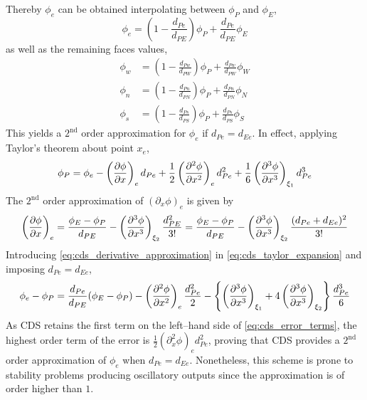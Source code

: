\noindent
Thereby $\phi_e$ can be obtained interpolating between $\phi_P$ and $\phi_E$,
\begin{equation} \label{eq:cds_e}
	\phi_e = \left( 1 - \frac{d_{Pe}}{d_{PE}} \right) \phi_P + \frac{d_{Pe}}{d_{PE}} \phi_E
\end{equation}
as well as the remaining faces values,
\begin{align}
	\phi_w &= \left( 1 - \frac{d_{Pw}}{d_{PW}} \right) \phi_P + \frac{d_{Pw}}{d_{PW}} \phi_W \\
	\phi_n &= \left( 1 - \frac{d_{Pn}}{d_{PN}} \right) \phi_P + \frac{d_{Pn}}{d_{PN}} \phi_N \\
	\phi_s &= \left( 1 - \frac{d_{Ps}}{d_{PS}} \right) \phi_P + \frac{d_{Ps}}{d_{PS}} \phi_S \label{eq:cds_s}
\end{align}
This yields a $2^{\text{nd}}$ order approximation for $\phi_e$ if $d_{Pe} = d_{Ee}$. In effect, applying Taylor's theorem about point $x_e$,
\begin{equation} \label{eq:cds_taylor_expansion}
	\phi_P = 
	\phi_e 
	- \left(\pdv{\phi}{x}\right)_e d_{Pe} 
	+ \frac{1}{2} \left(\pdv[2]{\phi}{x}\right)_e d_{Pe}^2 
	+ \frac{1}{6} \left(\pdv[3]{\phi}{x}\right)_{\xi_1} d_{Pe}^3
\end{equation}
The $2^\text{nd}$ order approximation of $(\partial_x \phi)_e$ is given by
\begin{equation} \label{eq:cds_derivative_approximation}
	\left(\pdv{\phi}{x}\right)_e = 
	\frac{\phi_E - \phi_P}{d_{PE}} - \left(\pdv[3]{\phi}{x}\right)_{\xi_2} \frac{d_{PE}^2}{3!} = 	
	\frac{\phi_E - \phi_P}{d_{PE}} - \left(\pdv[3]{\phi}{x}\right)_{\xi_2} \frac{(d_{Pe} + d_{Ee})^2}{3!}
\end{equation}
Introducing \eqref{eq:cds_derivative_approximation} in \eqref{eq:cds_taylor_expansion} and imposing $d_{Pe} = d_{Ee}$, 
\begin{equation} \label{eq:cds_error_terms}
	\phi_e - \phi_P = 
	\frac{d_{Pe}}{d_{PE}} (\phi_E - \phi_P) - 
	\left( \pdv[2]{\phi}{x} \right)_e \frac{d_{Pe}^2}{2} -
	\left\{ 
	\left( \pdv[3]{\phi}{x} \right)_{\xi_1} + 4 \left( \pdv[3]{\phi}{x} \right)_{\xi_2}
	\right\} 
	\frac{d_{Pe}^3}{6}
\end{equation}
As CDS retains the first term on the left--hand side of \eqref{eq:cds_error_terms}, the highest order term of the error is $\frac{1}{2} (\partial_x^2 \phi)_e d_{Pe}^2$, proving that CDS provides a $2^\text{nd}$ order approximation of $\phi_e$ when $d_{Pe} = d_{Ee}$. Nonetheless, this scheme is prone to stability problems producing oscillatory outputs since the approximation is of order higher than $1$.

